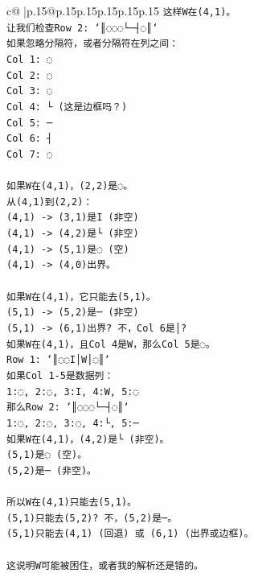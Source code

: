 \documentclass{article}
\begin{document}
{\begin{supertabular}{c@{$\;$}|p{.15\linewidth}@{}p{.15\linewidth}p{.15\linewidth}p{.15\linewidth}p{.15\linewidth}p{.15\linewidth}}
{{{\texttt{这样W在(4,1)。} \\
\texttt{让我们检查Row 2: `║◌◌◌└─┤◌║`} \\
\texttt{如果忽略分隔符，或者分隔符在列之间：} \\
\texttt{Col 1: ◌} \\
\texttt{Col 2: ◌} \\
\texttt{Col 3: ◌} \\
\texttt{Col 4: └ (这是边框吗？)} \\
\texttt{Col 5: ─} \\
\texttt{Col 6: ┤} \\
\texttt{Col 7: ◌} \\
\\ 
\texttt{如果W在(4,1)，(2,2)是◌。} \\
\texttt{从(4,1)到(2,2)：} \\
\texttt{(4,1) {-}> (3,1)是I (非空)} \\
\texttt{(4,1) {-}> (4,2)是└ (非空)} \\
\texttt{(4,1) {-}> (5,1)是◌ (空)} \\
\texttt{(4,1) {-}> (4,0)出界。} \\
\\ 
\texttt{如果W在(4,1)，它只能去(5,1)。} \\
\texttt{(5,1) {-}> (5,2)是─ (非空)} \\
\texttt{(5,1) {-}> (6,1)出界? 不，Col 6是│?} \\
\texttt{如果W在(4,1)，且Col 4是W，那么Col 5是◌。} \\
\texttt{Row 1: `║◌◌I│W│◌║`} \\
\texttt{如果Col 1{-}5是数据列：} \\
\texttt{1:◌, 2:◌, 3:I, 4:W, 5:◌} \\
\texttt{那么Row 2: `║◌◌◌└─┤◌║`} \\
\texttt{1:◌, 2:◌, 3:◌, 4:└, 5:─} \\
\texttt{如果W在(4,1)，(4,2)是└ (非空)。} \\
\texttt{(5,1)是◌ (空)。} \\
\texttt{(5,2)是─ (非空)。} \\
\\ 
\texttt{所以W在(4,1)只能去(5,1)。} \\
\texttt{(5,1)只能去(5,2)? 不，(5,2)是─。} \\
\texttt{(5,1)只能去(4,1) (回退) 或 (6,1) (出界或边框)。} \\
\\ 
\texttt{这说明W可能被困住，或者我的解析还是错的。} \\
}}}
\end{supertabular}}
\end{document}
